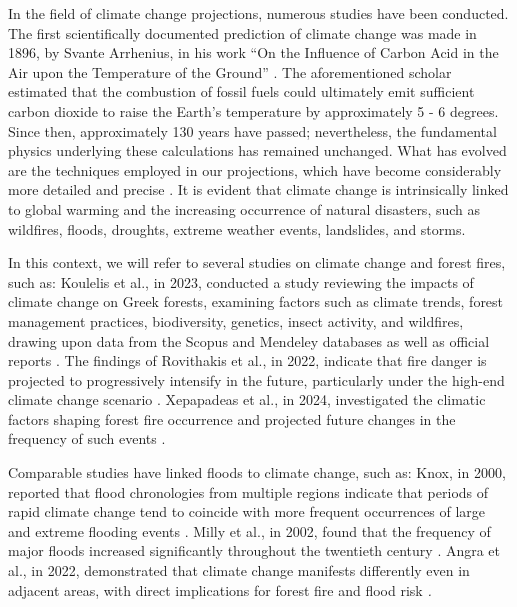 \documentclass[12pt]{Definitions/academia}
\begin{document}
In the field of climate change projections, numerous studies have
been conducted. The first scientifically documented prediction of
climate change was made in 1896, by Svante Arrhenius, in his work
\textquotedblleft On the Influence of Carbon Acid in the Air upon
the Temperature of the Ground\textquotedblright{} \textit{\cite{Arrhenius}}.
The aforementioned scholar estimated that the combustion of fossil
fuels could ultimately emit sufficient carbon dioxide to raise the
Earth\textquoteright s temperature by approximately 5 - 6 degrees. Since then, approximately 130 years have passed; nevertheless,
the fundamental physics underlying these calculations has remained
unchanged. What has evolved are the techniques employed in our projections,
which have become considerably more detailed and precise \textit{\cite{Rolnick 2022}}.
It is evident that climate change is intrinsically linked to global
warming and the increasing occurrence of natural disasters, such as
wildfires, floods, droughts, extreme weather events, landslides, and
storms.

In this context, we will refer to several studies on climate change
and forest fires, such as: Koulelis et al., in 2023, conducted a study
reviewing the impacts of climate change on Greek forests, examining
factors such as climate trends, forest management practices, biodiversity,
genetics, insect activity, and wildfires, drawing upon data from the
Scopus and Mendeley databases as well as official reports \textit{\cite{Koulelis 2023}}.
The findings of Rovithakis et al., in 2022, indicate that fire danger
is projected to progressively intensify in the future, particularly
under the high-end climate change scenario \textit{\cite{Rovithakis 2022}}.
Xepapadeas et al., in 2024, investigated the climatic factors shaping
forest fire occurrence and projected future changes in the frequency
of such events \textit{\cite{Xepapadeas 2024}}.

Comparable studies have linked floods to climate change, such as:
Knox, in 2000, reported that flood chronologies from multiple regions
indicate that periods of rapid climate change tend to coincide with
more frequent occurrences of large and extreme flooding events \textit{\cite{Knox 2000}}.
Milly et al., in 2002, found that the frequency of major floods increased
significantly throughout the twentieth century \textit{\cite{Milly 2002}}.
Angra et al., in 2022, demonstrated that climate change manifests
differently even in adjacent areas, with direct implications for forest
fire and flood risk \textit{\cite{Angra 2022}. }
\end{document}
